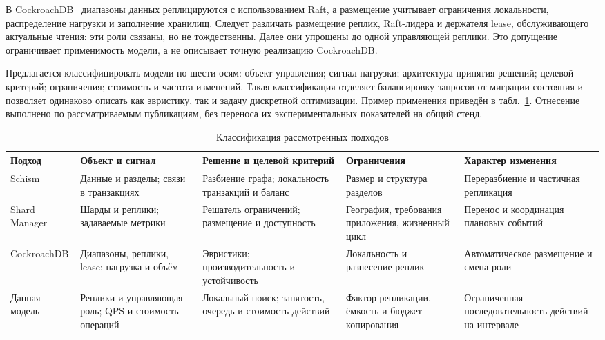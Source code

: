 \documentclass{misisarticle}
\begin{document}
В CockroachDB~\cite{taft2020} диапазоны данных реплицируются с использованием Raft, а размещение учитывает ограничения локальности, распределение нагрузки и заполнение хранилищ. Следует различать размещение реплик, Raft-лидера и держателя lease, обслуживающего актуальные чтения: эти роли связаны, но не тождественны. Далее они упрощены до одной управляющей реплики. Это допущение ограничивает применимость модели, а не описывает точную реализацию CockroachDB.

Предлагается классифицировать модели по шести осям: объект управления; сигнал нагрузки; архитектура принятия решений; целевой критерий; ограничения; стоимость и частота изменений. Такая классификация отделяет балансировку запросов от миграции состояния и позволяет одинаково описать как эвристику, так и задачу дискретной оптимизации. Пример применения приведён в табл.~\ref{tab:classification}. Отнесение выполнено по рассматриваемым публикациям, без переноса их экспериментальных показателей на общий стенд.

\begin{table}[t]
\caption{Классификация рассмотренных подходов}
\label{tab:classification}
\centering
\small
\setlength{\tabcolsep}{4pt}
\begin{tabular}{>{\raggedright\arraybackslash}p{2.15cm}>{\raggedright\arraybackslash}p{3.3cm}>{\raggedright\arraybackslash}p{4.0cm}>{\raggedright\arraybackslash}p{3.3cm}>{\raggedright\arraybackslash}p{3.5cm}}
\toprule
Подход & Объект и сигнал & Решение и целевой критерий & Ограничения & Характер изменения \\
\midrule
Schism & Данные и разделы; связи в транзакциях & Разбиение графа; локальность транзакций и баланс & Размер и структура разделов & Переразбиение и частичная репликация \\
Shard Manager & Шарды и реплики; задаваемые метрики & Решатель ограничений; размещение и доступность & География, требования приложения, жизненный цикл & Перенос и координация плановых событий \\
CockroachDB & Диапазоны, реплики, lease; нагрузка и объём & Эвристики; производительность и устойчивость & Локальность и разнесение реплик & Автоматическое размещение и смена роли \\
Данная модель & Реплики и управляющая роль; QPS и стоимость операций & Локальный поиск; занятость, очередь и стоимость действий & Фактор репликации, ёмкость и бюджет копирования & Ограниченная последовательность действий на интервале \\
\bottomrule
\end{tabular}
\end{table}
\end{document}
